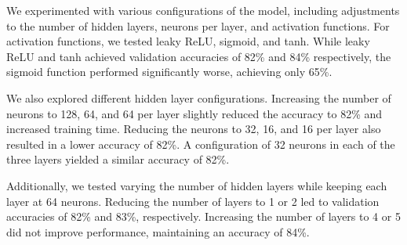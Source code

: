 \begin{itemize}
We experimented with various configurations of the model, including adjustments to the number of hidden layers, neurons per layer, and activation functions. For activation functions, we tested leaky ReLU, sigmoid, and tanh. While leaky ReLU and tanh achieved validation accuracies of 82\% and 84\% respectively, the sigmoid function performed significantly worse, achieving only 65\%.

We also explored different hidden layer configurations. Increasing the number of neurons to 128, 64, and 64 per layer slightly reduced the accuracy to 82\% and increased training time. Reducing the neurons to 32, 16, and 16 per layer also resulted in a lower accuracy of 82\%. A configuration of 32 neurons in each of the three layers yielded a similar accuracy of 82\%.

Additionally, we tested varying the number of hidden layers while keeping each layer at 64 neurons. Reducing the number of layers to 1 or 2 led to validation accuracies of 82\% and 83\%, respectively. Increasing the number of layers to 4 or 5 did not improve performance, maintaining an accuracy of 84\%.


\end{itemize}
